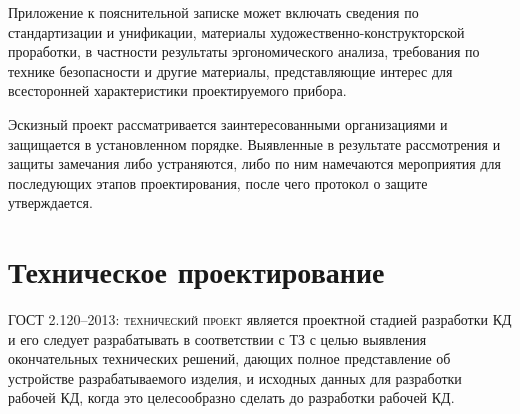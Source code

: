 Приложение к пояснительной записке может включать сведения по стандартизации и унификации, материалы художественно-конструкторской проработки, в частности результаты эргономического анализа, требования по технике безопасности и другие материалы, представляющие интерес для всесторонней характеристики проектируемого прибора.

Эскизный проект рассматривается заинтересованными организациями и защищается в установленном порядке. 
Выявленные в результате рассмотрения и защиты замечания либо устраняются, либо по ним намечаются мероприятия для последующих этапов проектирования, после чего протокол о защите утверждается.

\section{Техническое проектирование}

\noindent
ГОСТ 2.120–2013: \textsc{технический проект} является проектной стадией разработки КД и его следует разрабатывать в соответствии с ТЗ с целью выявления окончательных технических решений, дающих  полное представление об устройстве разрабатываемого изделия, и исходных данных для разработки рабочей КД, когда это целесообразно сделать до разработки рабочей КД. 

